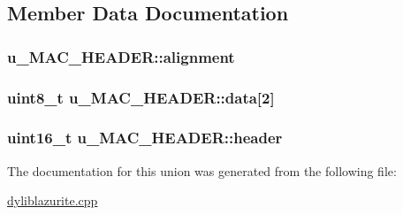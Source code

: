 \subsection{Member Data Documentation}
\hypertarget{unionu__MAC__HEADER_a1c739e4633999a0e405773cbf6a8325e}{
\subsubsection[{alignment}]{ u\+\_\+\+M\+A\+C\+\_\+\+H\+E\+A\+D\+E\+R\+::alignment}}\label{unionu__MAC__HEADER_a1c739e4633999a0e405773cbf6a8325e}
\hypertarget{unionu__MAC__HEADER_ad8cc8f1178fe6e616e95b32d18374853}{
\subsubsection[{data}]{\setlength{\rightskip}{0pt plus 5cm}uint8\+\_\+t u\+\_\+\+M\+A\+C\+\_\+\+H\+E\+A\+D\+E\+R\+::data\mbox{[}2\mbox{]}}}\label{unionu__MAC__HEADER_ad8cc8f1178fe6e616e95b32d18374853}
\hypertarget{unionu__MAC__HEADER_add55dd877a63f66da16c1a094e473cca}{
\subsubsection[{header}]{\setlength{\rightskip}{0pt plus 5cm}uint16\+\_\+t u\+\_\+\+M\+A\+C\+\_\+\+H\+E\+A\+D\+E\+R\+::header}}\label{unionu__MAC__HEADER_add55dd877a63f66da16c1a094e473cca}


The documentation for this union was generated from the following file\+:\begin{DoxyCompactItemize}
\item 
\hyperlink{dyliblazurite_8cpp}{dyliblazurite.\+cpp}\end{DoxyCompactItemize}
